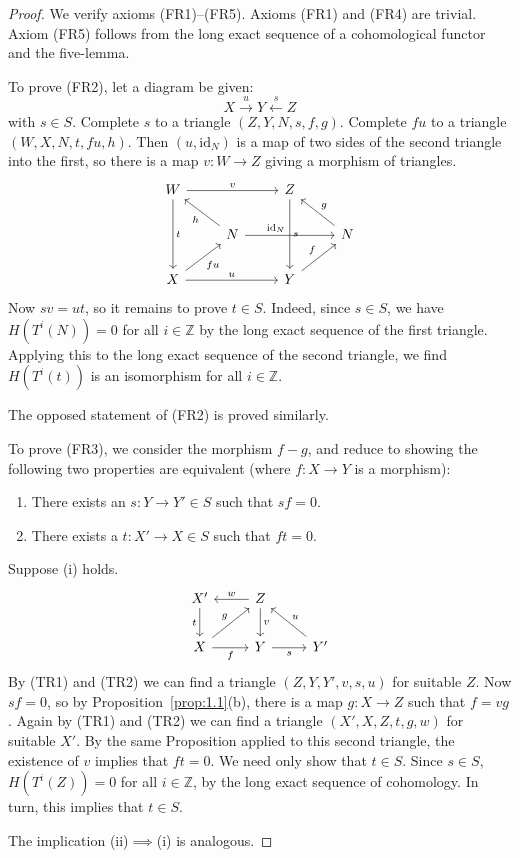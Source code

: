 \begin{proof}
We verify axioms (FR1)--(FR5). Axioms (FR1) and (FR4) are trivial. Axiom (FR5) follows from the long exact sequence of a cohomological functor and the five-lemma.

To prove (FR2), let a diagram be given:
\[
X\xrightarrow{u} Y \xleftarrow{s} Z
\]
with $s\in S$. Complete \(s\) to a triangle \((Z,Y,N,s,f,g)\). Complete \(fu\) to a triangle \((W,X,N,t,fu,h)\). Then \((u, \mathrm{id}_N)\) is a map of two sides of the second triangle into the first, so there is a map \(v: W \longrightarrow Z\) giving a morphism of triangles.
\[
\begin{tikzcd}
	W \arrow[rr, "v"] \arrow[dd, "t"] & & Z \arrow[dd, "s"]  & \\
	& N \arrow[ul, "h"] \arrow[rr, "\mathrm{id}_N\quad\quad"] & & N \arrow[ul, "g"'] \\
	X \arrow[rr, "u"] \arrow[ur, "fu"'] & & Y \arrow[ru, "f"] &
\end{tikzcd}
\]
Now \(sv = ut\), so it remains to prove \(t \in S\). Indeed, since \(s \in S\), we have \(H(T^i(N)) = 0\) for all \(i \in \mathbb{Z}\) by the long exact sequence of the first triangle. Applying this to the long exact sequence of the second triangle, we find \(H(T^i(t))\) is an isomorphism for all \(i \in \mathbb{Z}\).

The opposed statement of (FR2) is proved similarly.

To prove (FR3), we consider the morphism \(f-g\), and reduce to showing the following two properties are equivalent (where \(f: X \longrightarrow Y\) is a morphism):

\begin{enumerate}
\item[(i)] There exists an $s\colon Y\to Y'\in S$ such that $sf=0$.
\item[(ii)] There exists a $t\colon X'\to X\in S$ such that $ft=0$.
\end{enumerate}
Suppose (i) holds.
\[
\begin{tikzcd}[row sep=2em, column sep=2.5em]
	X' \arrow[d, "t"'] & Z \arrow[l, "w"'] \arrow[d, "v"] \\
	X \arrow[r, "f"'] \arrow[ru, "g"]  & Y \arrow[r, "s"']  & Y' \arrow[lu, "u"']
\end{tikzcd}
\]
By (TR1) and (TR2) we can find a triangle \((Z,Y,Y',v,s,u)\) for suitable \(Z\). Now \(sf = 0\), so by Proposition~\ref{prop:1.1}(b), there is a map \(g: X \longrightarrow Z\) such that \(f = vg\). Again by (TR1) and (TR2) we can find a triangle \((X',X,Z,t,g,w)\) for suitable \(X'\). By the same Proposition applied to this second triangle, the existence of \(v\) implies that \(ft = 0\). We need only show that \(t \in S\). Since \(s \in S\), \(H(T^i(Z)) = 0\) for all \(i \in \mathbb{Z}\), by the long exact sequence of cohomology. In turn, this implies that \(t \in S\).

The implication (ii)\(\implies\)(i) is analogous.
\end{proof}

